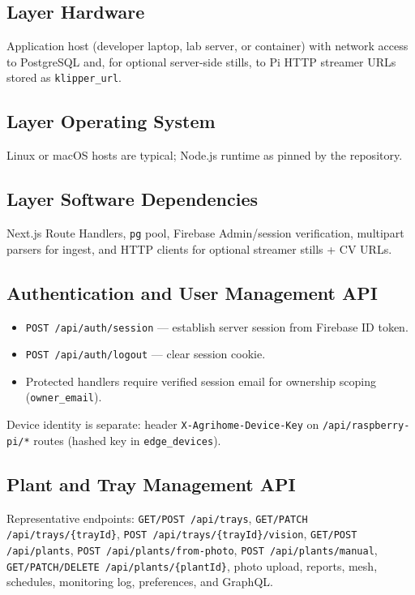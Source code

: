 \documentclass[11pt,letterpaper]{article}
\begin{document}
\subsection{Layer Hardware}
Application host (developer laptop, lab server, or container) with network access to PostgreSQL
and, for optional server-side stills, to Pi HTTP streamer URLs stored as \texttt{klipper\_url}.

\subsection{Layer Operating System}
Linux or macOS hosts are typical; Node.js runtime as pinned by the repository.

\subsection{Layer Software Dependencies}
Next.js Route Handlers, \texttt{pg} pool, Firebase Admin/session verification, multipart parsers
for ingest, and HTTP clients for optional streamer stills + CV URLs.

\subsection{Authentication and User Management API}
\begin{itemize}
  \item \texttt{POST /api/auth/session} --- establish server session from Firebase ID token.
  \item \texttt{POST /api/auth/logout} --- clear session cookie.
  \item Protected handlers require verified session email for ownership scoping
        (\texttt{owner\_email}).
\end{itemize}
Device identity is separate: header \texttt{X-Agrihome-Device-Key} on
\texttt{/api/raspberry-pi/*} routes (hashed key in \texttt{edge\_devices}).

\subsection{Plant and Tray Management API}
Representative endpoints: \texttt{GET/POST /api/trays},
\texttt{GET/PATCH /api/trays/\{trayId\}}, \texttt{POST /api/trays/\{trayId\}/vision},
\texttt{GET/POST /api/plants}, \texttt{POST /api/plants/from-photo},
\texttt{POST /api/plants/manual}, \texttt{GET/PATCH/DELETE /api/plants/\{plantId\}},
photo upload, reports, mesh, schedules, monitoring log, preferences, and GraphQL.
\end{document}
